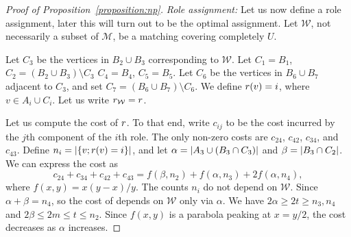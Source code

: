 \begin{proof}[Proof of Proposition~\ref{proposition:np}]
\iffalse
The first part entails vertex sets $A$ and $B$ with $\abs{A} = 3$ and $\abs{B}
= \ell$.  Each vertex $a \in A$ and $b \in B$ is connected with a \emph{fat} edge:
$t$ copies of a path $a$--$x$--$b$, where $x$ is a vertex unique to the path.
Each vertex $a \in A$ is connected to its own clique of size $h$.  Finally, one
vertex, say $b^* \in B$ is connected to an additional vertex, who is also connected
to a biclique $K(s, s)$.

The final graph consists of $t$ copies of the first part.

The second part is very similar to the first.  It entails the vertex sets $A'$
and $B'$ with $\abs{A'} = n$ and $\abs{B'} = h$. Here $A'$ corresponds to the
universe $U$.  Each vertex $a \in A'$ and $b \in B'$ is connected with a
\emph{fat} edge of size $t$.  Finally, let $C'$ be the subset of $B'$ that
corresponds to the sets in $\mathcal{M}$.  Each vertex $c \in C'$ is connected
to its own unique vertex. We will denote these vertices by $O'$.
Each vertex in $O'$ is also connected to its own dedicated bi-clique
$K(s, s)$. 
\fi

\emph{Role assignment:}
Let us now define a role assignment, later this will turn out to be the optimal
assignment. Let $\mathcal{W}$, not necessarily a subset of $\mathcal{M}$, be a
matching covering completely $U$.

Let $C_3$ be the vertices in $B_2 \cup B_3$ corresponding to $\mathcal{W}$.
Let $C_1 = B_1$, $C_2 = (B_2 \cup B_3) \setminus C_3$ $C_4 = B_4$, $C_5 = B_5$.
Let $C_6$ be the vertices in $B_6 \cup B_7$ adjacent to $C_3$, and set $C_7 = (B_6 \cup B_7) \setminus C_6$.
We define $r(v) = i$, where $v \in A_i \cup C_i$.
Let us write $r_{\mathcal{W}} = r$.

Let us compute the cost of $r$.
To that end, write $c_{ij}$ to be the cost incurred by the $j$th component of the $i$th role.
The only non-zero costs are $c_{24}$, $c_{42}$, $c_{34}$, and $c_{43}$.
Define $n_i = {\left|\left\{v ; r(v) = i\right\}\right|}$,
and let $\alpha = {\left|A_3 \cup (B_3 \cap C_3)\right|}$ and $\beta = {\left|B_3 \cap C_2\right|}$.
We can express the cost as
\[
	c_{24} + c_{34} + c_{42} + c_{43} = f(\beta, n_2) + f(\alpha, n_3) + 2f(\alpha, n_4),
\]
where $f(x, y) = x(y - x)/y$.
The counts $n_i$ do not depend on $\mathcal{W}$.
Since $\alpha + \beta = n_4$, so the cost of depends on $\mathcal{W}$ only via $\alpha$.
We have $2\alpha \geq 2t \geq n_3, n_4$ and $2\beta \leq 2m \leq t \leq n_2$.
Since $f(x, y)$ is a parabola peaking at $x = y / 2$,
the cost decreases as $\alpha$ increases.


\end{proof}
